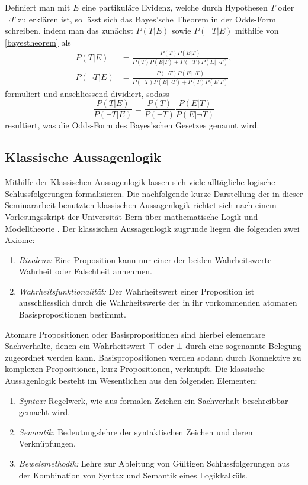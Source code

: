 \documentclass[a4paper,11pt]{article}
\numberwithin{equation}{section}
\begin{document}
Definiert man mit $E$ eine partikuläre Evidenz, welche durch Hypothesen $T$ oder $\neg T$ zu erklären ist, so lässt sich das Bayes'sche Theorem in der Odds-Form schreiben, indem man das zunächst $P(T|E)$ sowie $P(\neg T |E)$ mithilfe von \eqref{bayestheorem} als \begin{align}
P(T|E) &= \frac{P(T)P(E|T)}{P(T)P(E|T)+P(\neg T)P(E|\neg T)}, \\ P(\neg T|E) &= \frac{P(\neg T)P(E|\neg T)}{P(\neg T)P(E|\neg T)+P(T)P(E|T)} \end{align} formuliert und anschliessend dividiert, sodass
\begin{equation}\label{bayesodds}
\frac{P(T|E)}{P(\neg T|E)}
= \frac{P(T)}{P(\neg T)}\frac{P(E|T)}{P(E|\neg T)}\end{equation} resultiert, was die Odds-Form des Bayes'schen Gesetzes genannt wird.


\subsection{Klassische Aussagenlogik}\label{defklassausslogik}
Mithilfe der Klassischen Aussagenlogik lassen sich viele alltägliche logische Schlussfolgerungen formalisieren. Die nachfolgende kurze Darstellung der in dieser Seminararbeit benutzten klassischen Aussagenlogik richtet sich nach einem Vorlesungsskript der Universität Bern über mathematische Logik und Modelltheorie \cite[S. 7-14]{GeorgeMetcalfe.2018}. Der klassischen Aussagenlogik zugrunde liegen die folgenden zwei Axiome: \begin{enumerate}
\item \textit{Bivalenz: }Eine Proposition kann nur einer der beiden Wahrheitswerte Wahrheit oder Falschheit annehmen.
\item \textit{Wahrheitsfunktionalität: }Der Wahrheitswert einer Proposition ist ausschliesslich durch die Wahrheitswerte der in ihr vorkommenden atomaren Basispropositionen bestimmt.
\end{enumerate} Atomare Propositionen oder Basispropositionen sind hierbei elementare Sachverhalte, denen ein Wahrheitswert $\top$ oder $\bot$ durch eine sogenannte Belegung zugeordnet werden kann. Basispropositionen werden sodann durch Konnektive zu komplexen Propositionen, kurz Propositionen, verknüpft. Die klassische Aussagenlogik besteht im Wesentlichen aus den folgenden Elementen: \begin{enumerate}
\item \textit{Syntax: }Regelwerk, wie aus formalen Zeichen ein Sachverhalt beschreibbar gemacht wird.
\item \textit{Semantik: }Bedeutungslehre der syntaktischen Zeichen und deren Verknüpfungen.
\item \textit{Beweismethodik: }Lehre zur Ableitung von Gültigen Schlussfolgerungen aus der Kombination von Syntax und Semantik eines Logikkalküls.
\end{enumerate}
\end{document}
